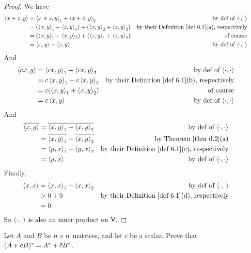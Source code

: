 \begin{proof}
We have
\begin{align*}
    \LG x + z, y \RG & = \LG x + z, y \RG_1 + \LG x + z, y \RG_2 & \text{by def of \(\InnerOp\)} \\
        & = (\LG x, y \RG_1 + \LG z, y \RG_1) + (\LG x, y \RG_2 + \LG z, y \RG_2) & \text{by their \DEF{6.1}(a), respectively} \\
        & = (\LG x, y \RG_1 + \LG x, y \RG_2) + (\LG z, y \RG_1 + \LG z, y \RG_2) & \text{of course} \\
        & = \LG x, y \RG + \LG z, y \RG & \text{by def of \(\InnerOp\)}
\end{align*}
And
\begin{align*}
    \LG cx, y \RG & = \LG cx, y \RG_1 + \LG cx, y \RG_2 & \text{by def of \(\InnerOp\)} \\
        & = c\LG x, y \RG_1 + c\LG x, y \RG_2 & \text{by their \DEF{6.1}(b), respectively} \\
        & = c(\LG x, y \RG_1 + \LG x, y \RG_2) & \text{of course} \\
        & = c\LG x, y \RG & \text{by def of \(\InnerOp\)}
\end{align*}
And
\begin{align*}
    \conjugatet{\LG x, y \RG} & = \conjugatet{\LG x, y \RG_1 + \LG x, y \RG_2} & \text{by def of \(\InnerOp\)} \\
        & = \conjugatet{\LG x, y \RG_1} + \conjugatet{\LG x, y \RG_2} & \text{by \THM{d.2}(a)} \\
        & = \LG y, x \RG_1 + \LG y, x \RG_2 & \text{by their \DEF{6.1}(c), respectively} \\
        & = \LG y, x \RG & \text{by def of \(\InnerOp\)}
\end{align*}
Finally,
\begin{align*}
    \LG x, x \RG & = \LG x, x \RG_1 + \LG x, x \RG_2 & \text{by def of \(\InnerOp\)} \\
        & > 0 + 0 & \text{by their \DEF{6.1}(d), respectively} \\
        & = 0.
\end{align*}
So \(\left< \cdot, \cdot \right>\) is also an inner product on \(\textsf{V}\).
\end{proof}

\begin{exercise} \label{exercise 6.1.14}
Let \(A\) and \(B\) be \(n \times n\) matrices, and let \(c\) be a scalar.
Prove that \((A + cB)^* = A^* + \overline{c}B^*\).
\end{exercise}

